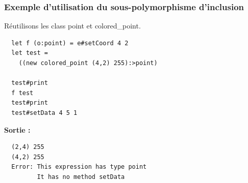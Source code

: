 \begin{frame}[fragile]
	\frametitle{Exemple d'utilisation du sous-polymorphisme d'inclusion}
	Réutilisons les class point et colored\_point.
	\begin{lstlisting}
  let f (o:point) = e#setCoord 4 2
  let test = 
    ((new colored_point (4,2) 255):>point)

  test#print
  f test
  test#print
  test#setData 4 5 1
	\end{lstlisting}
	\textbf{Sortie :}
	\begin{lstlisting}
  (2,4) 255
  (4,2) 255
  Error: This expression has type point
         It has no method setData
	\end{lstlisting}
\end{frame}
